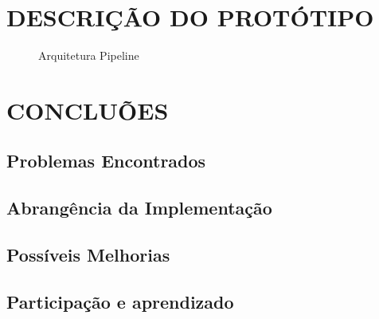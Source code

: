 \documentclass[letterpaper, 10 pt, conference]{ieeeconf}  %
\begin{document}
\section{DESCRIÇÃO DO PROTÓTIPO}

\begin{figure}[thpb]
      \centering
      \caption{Arquitetura Pipeline}
      \label{}
   \end{figure}

\section{CONCLUÕES}

\subsection{Problemas Encontrados}

\subsection{Abrangência da Implementação}

\subsection{Possíveis Melhorias}

\subsection{Participação e aprendizado}

\addtolength{\textheight}{-12cm}   

\begin{thebibliography}{99}


\end{thebibliography}
\end{document}
